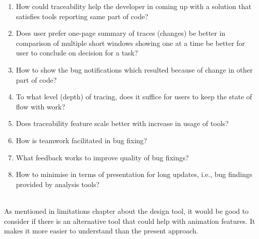 \begin{enumerate}
\item How could traceability help the developer in coming up with a solution that satisfies tools reporting same part of code?
\item Does user prefer one-page summary of traces (changes) be better in comparison of multiple short windows showing one at a time be better for user to conclude on decision for a task?
\item How to show the bug notifications which resulted because of change in other part of code?
\item To what level (depth) of tracing, does it suffice for users to keep the state of flow with work?
\item Does traceability feature scale better with increase in usage of tools?
\item How is teamwork facilitated in bug fixing?
\item What feedback works to improve quality of bug fixings? 
\item How to minimise in terms of presentation for long updates, i.e., bug findings provided by analysis tools? \\ \\
\end{enumerate} 

As mentioned in limitations chapter about the design tool, it would be good to consider if there is an alternative tool that could help with animation features.  It makes it more easier to understand than the present approach.